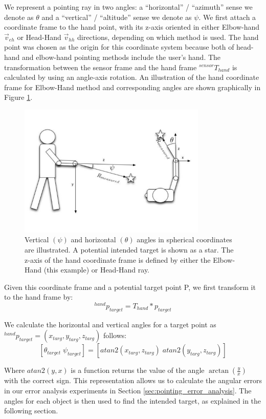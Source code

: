 We represent a pointing ray in two angles: a ``horizontal'' / ``azimuth'' sense we denote as $\theta$ and a ``vertical'' / ``altitude'' sense we denote as $\psi$. We first attach a coordinate frame to the hand point, with its z-axis oriented in either Elbow-hand $\vec{v}_{eh}$ or Head-Hand $\vec{v}_{hh}$ directions, depending on which method is used. The hand point was chosen as the origin for this coordinate system because both of head-hand and elbow-hand pointing methods include the user's hand. The transformation between the sensor frame and the hand frame $^{sensor}T_{hand}$ is calculated by using an angle-axis rotation. An illustration of the hand coordinate frame for Elbow-Hand method and corresponding angles are shown graphically in Figure \ref{fig:pointing_angle_errors}.

\begin{figure}[ht!]
\centering
\includegraphics[width=0.8\textwidth]{pics/person_angles_combined_2}
\caption{Vertical $(\psi)$ and horizontal $(\theta)$ angles in spherical coordinates are illustrated. A potential intended target is shown as a star. The z-axis of the hand coordinate frame is defined by either the Elbow-Hand (this example) or Head-Hand ray.}
\label{fig:pointing_angle_errors}
\end{figure}

Given this coordinate frame and a potential target point P, we first transform it to the hand frame by:
$$^{hand}p_{target} = T_{hand} * p_{target}$$

We calculate the horizontal and vertical angles for a target point as $^{hand}p_{target} = (x_{targ}, y_{targ}, z_{targ})$ follows:
$$[\theta_{target}\;\psi_{target}]=[atan2(x_{targ}, z_{targ})\;atan2(y_{targ}, z_{targ})]$$

Where $atan2(y,x)$ is a function returns the value of the angle $\arctan(\frac{y}{x})$ with the correct sign. This representation allows us to calculate the angular errors in our error analysis experiments in Section \ref{sec:pointing_error_analysis}. The angles for each object is then used to find the intended target, as explained in the following section.


